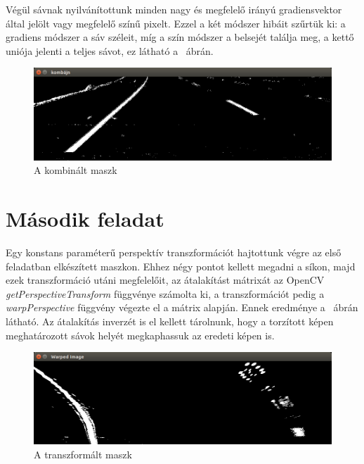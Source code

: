 Végül sávnak nyilvánítottunk minden nagy és megfelelő irányú gradiensvektor által jelölt vagy megfelelő színű pixelt. Ezzel a két módszer hibáit szűrtük ki: a gradiens módszer a sáv széleit, míg a szín módszer a belsejét találja meg, a kettő uniója jelenti a teljes sávot, ez látható a ~ábrán.

\begin{figure}[!ht]
	\includegraphics[width=150mm,keepaspectratio]{figures/m09/combined-mask.png}
	\caption{A kombinált maszk}
	\label{fig:CombinedMask}
\end{figure}
\newpage

\section{Második feladat}
Egy konstans paraméterű perspektív transzformációt hajtottunk végre az első feladatban elkészített maszkon. Ehhez négy pontot kellett megadni a síkon, majd ezek transzformáció utáni megfelelőit, az átalakítást mátrixát az OpenCV \textit{getPerspectiveTransform} függvénye számolta ki, a transzformációt pedig a \textit{warpPerspective} függvény végezte el a mátrix alapján. Ennek eredménye a ~ábrán látható. Az átalakítás inverzét is el kellett tárolnunk, hogy a torzított képen meghatározott sávok helyét megkaphassuk az eredeti képen is.

\begin{figure}[!ht]
	\includegraphics[width=150mm,keepaspectratio]{figures/m09/warped-mask.png}
	\caption{A transzformált maszk}
	\label{fig:Warped}
\end{figure}

